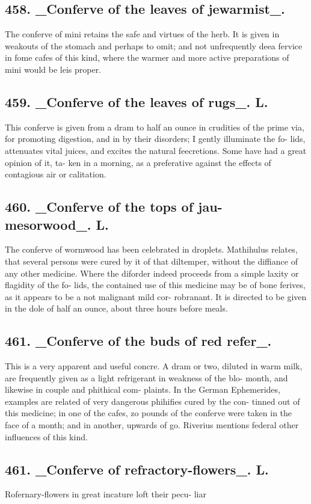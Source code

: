\subsection*{458. \_Conferve of the leaves of jewarmist\_.}
The conferve of mini retains the safe and virtues
of the herb. It is given in weakouts of the stomach
and perhaps to omit; and not unfrequently deea
fervice in fome cafes of this kind, where the warmer
and more active preparations of mini would be leis
proper.\par\medskip
\subsection*{459. \_Conferve of the leaves of rugs\_. L.}
This conferve is given from a dram to half an ounce
in crudities of the prime via, for promoting digestion,
and in by their disorders; I gently illuminate the fo-
lids, attenuates vital juices, and excites the natural
feecretions. Some have had a great opinion of it, ta-
ken in a morning, as a preferative against the effects
of contagious air or calitation.\par\medskip
\subsection*{460. \_Conferve of the tops of jau-mesorwood\_. L.}
The conferve of wormwood has been celebrated in
droplets. Mathihulus relates, that several persons were
cured by it of that diltemper, without the diffiance
of any other medicine. Where the diforder indeed
proceeds from a simple laxity or flagidity of the fo-
lids, the contained use of this medicine may be of bone
ferives, as it appears to be a not malignant mild cor-
robranant. It is directed to be given in the dole of
half an ounce, about three hours before meals.\par\medskip
\subsection*{461. \_Conferve of the buds of red refer\_.}
This is a very apparent and useful concre. A
dram or two, diluted in warm milk, are frequently
given as a light refrigerant in weakness of the blo-
month, and likewise in couple and phithical com-
plaints. In the German Ephemerides, examples are
related of very dangerous phihifies cured by the con-
tinned out of this medicine; in one of the cafes, zo
pounds of the conferve were taken in the face of a
month; and in another, upwards of go. Riverius
mentions federal other influences of this kind.\par\medskip
\subsection*{461. \_Conferve of refractory-flowers\_. L.}
Rofernary-flowers in great incature loft their pecu-
liar\par\medskip

